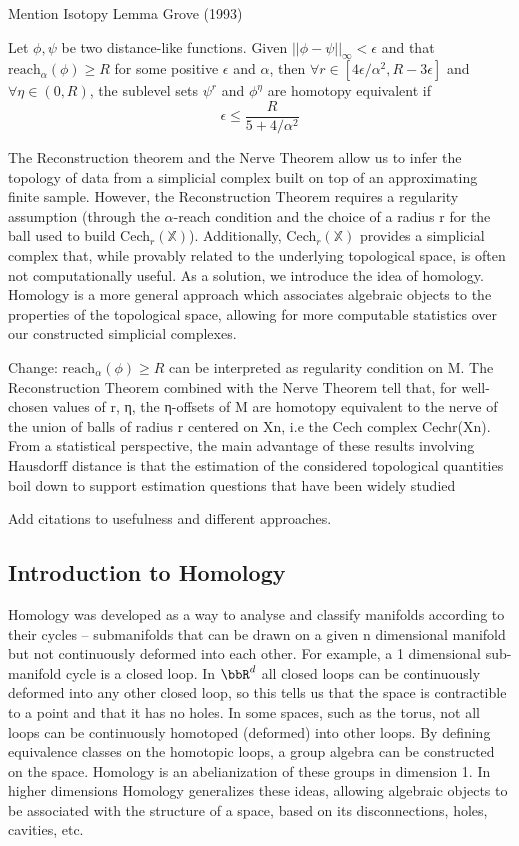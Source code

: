 Mention Isotopy Lemma Grove (1993)

\begin{theorem}
Let $\phi, \psi$ be two distance-like functions. Given $||\phi - \psi||_\infty < \epsilon$ and that $\text{reach}_\alpha(\phi) \geq R$ for some positive $\epsilon$ and $\alpha$, then $\forall{r} \in [4\epsilon/\alpha^2, R-3\epsilon]$ and $\forall{\eta}\in(0, R)$, the sublevel sets $\psi^r$ and $\phi^\eta$ are homotopy equivalent if $$\epsilon \leq \frac{R}{5+4/\alpha^2}$$
\end{theorem}

The Reconstruction theorem and the Nerve Theorem allow us to infer the topology of data from a simplicial complex built on top of an approximating finite sample. However, the Reconstruction Theorem requires a regularity assumption (through the $\alpha$-reach condition and the choice of a radius r for the ball used to build Cech$_r(\mathbb{X})$). Additionally, Cech$_r(\mathbb{X})$
provides a simplicial complex that, while provably related to the underlying topological space, is often not computationally useful. As a solution, we introduce the idea of homology. Homology is a more general approach which associates algebraic objects to the properties of the topological space, allowing for more computable statistics over our constructed simplicial complexes. 


Change:
$\text{reach}_\alpha(\phi) \geq R$ can be interpreted as regularity condition on M.
The Reconstruction Theorem combined with the
Nerve Theorem tell that, for well-chosen values of r, η, the η-offsets of M are homotopy equivalent
to the nerve of the union of balls of radius r centered on Xn, i.e the Cech complex Cechr(Xn).
From a statistical perspective, the main advantage of these results involving Hausdorff distance is that the estimation of the considered topological quantities boil down to support estimation questions that have been widely studied

Add citations to usefulness and different approaches. 


\subsection{Introduction to Homology} 

Homology was developed as a way to analyse and classify manifolds according to their cycles –  submanifolds that can be drawn on a given n dimensional manifold but not continuously deformed into each other. For example, a 1 dimensional sub-manifold cycle is a closed loop. In $\bbR^d$ all closed loops can be continuously deformed into any other closed loop, so this tells us that the space is contractible to a point and that it has no holes. In some spaces, such as the torus, not all loops can be continuously homotoped (deformed) into other loops. By defining equivalence classes on the homotopic loops, a group algebra can be constructed on the space. Homology is an abelianization of these groups in dimension 1. In higher dimensions Homology generalizes these ideas, allowing algebraic objects to be associated with the structure of a space, based on its disconnections, holes, cavities, etc. 


